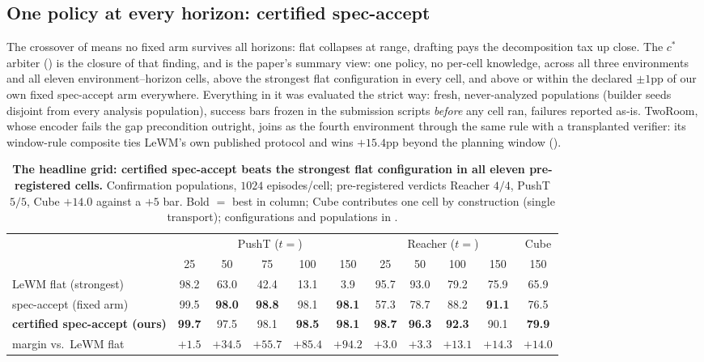 \documentclass{article}
\newcommand{\ours}[1]{\textbf{#1}}
\begin{document}
\subsection{One policy at every horizon: certified spec-accept}
\label{sec:results-unified}
The crossover of  means no fixed arm survives all horizons: flat
collapses at range, drafting pays the decomposition tax up close. The $c^{*}$ arbiter
() is the closure of that finding, and  is
the paper's summary view: one policy, no per-cell knowledge, across all three
environments and all eleven environment--horizon cells, above the strongest flat
configuration in every cell, and above or within the declared $\pm1$pp of our own
fixed spec-accept arm everywhere. Everything in it was evaluated the strict way:
fresh, never-analyzed populations (builder seeds disjoint from every analysis
population), success bars frozen in the submission scripts \emph{before} any cell
ran, failures reported as-is. TwoRoom, whose encoder fails the gap precondition
outright, joins as the fourth environment through the same rule with a transplanted
verifier: its window-rule composite ties LeWM's own published protocol and wins
$+15.4$pp beyond the planning window ().

\begin{table}[t]
\centering
\small
\setlength{\tabcolsep}{3.2pt}
\caption{\textbf{The headline grid: certified spec-accept beats the strongest flat
configuration in all eleven pre-registered cells.} Confirmation populations, $1024$
episodes/cell; pre-registered verdicts Reacher $4/4$, PushT $5/5$, Cube $+14.0$
against a $+5$ bar. Bold $=$ best in column; Cube contributes one cell by
construction (single transport); configurations and populations in
.}
\label{tab:grand}
\begin{tabular}{lccccc|cccc|c}
\toprule
& \multicolumn{5}{c|}{PushT ($t{=}$)} & \multicolumn{4}{c|}{Reacher ($t{=}$)} & Cube \\
& 25 & 50 & 75 & 100 & 150 & 25 & 50 & 100 & 150 & 150 \\
\midrule
LeWM flat (strongest)        & 98.2 & 63.0 & 42.4 & 13.1 & 3.9 & 95.7 & 93.0 & 79.2 & 75.9 & 65.9 \\
spec-accept (fixed arm)      & 99.5 & \ours{98.0} & \ours{98.8} & 98.1 & \ours{98.1} & 57.3 & 78.7 & 88.2 & \ours{91.1} & 76.5 \\
\ours{certified spec-accept (ours)} & \ours{99.7} & 97.5 & 98.1 & \ours{98.5} & \ours{98.1} & \ours{98.7} & \ours{96.3} & \ours{92.3} & 90.1 & \ours{79.9} \\
\midrule
margin vs.\ LeWM flat        & $+1.5$ & $+34.5$ & $+55.7$ & $+85.4$ & $+94.2$ & $+3.0$ & $+3.3$ & $+13.1$ & $+14.3$ & $+14.0$ \\
\bottomrule
\end{tabular}
\end{table}
\end{document}
